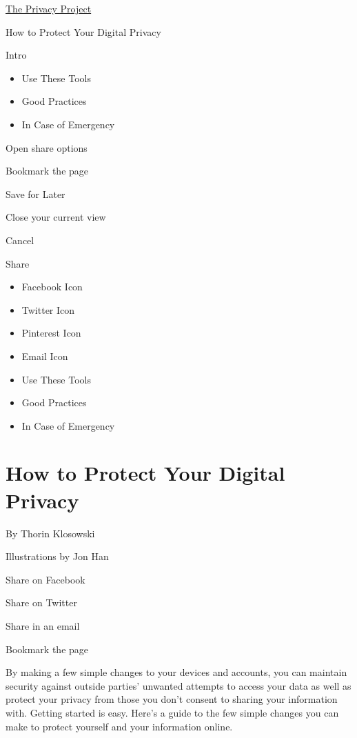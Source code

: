 \href{https://www.nytimes.com/interactive/2019/opinion/internet-privacy-project.html}{The
Privacy Project}

How to Protect Your Digital Privacy

Intro

\begin{itemize}
\tightlist
\item
  Use These Tools
\item
  Good Practices
\item
  In Case of Emergency
\end{itemize}

Open share options

Bookmark the page

Save for Later

Close your current view

Cancel

Share

\begin{itemize}
\tightlist
\item
  Facebook Icon
\item
  Twitter Icon
\item
  Pinterest Icon
\item
  Email Icon
\end{itemize}

\begin{itemize}
\tightlist
\item
  Use These Tools
\item
  Good Practices
\item
  In Case of Emergency
\end{itemize}

\hypertarget{how-to-protect-your-digital-privacy}{%
\section{How to Protect Your Digital
Privacy}\label{how-to-protect-your-digital-privacy}}

By Thorin Klosowski

Illustrations by Jon Han

Share on Facebook

Share on Twitter

Share in an email

Bookmark the page

By making a few simple changes to your devices and accounts, you can
maintain security against outside parties' unwanted attempts to access
your data as well as protect your privacy from those you don't consent
to sharing your information with. Getting started is easy. Here's a
guide to the few simple changes you can make to protect yourself and
your information online.~

